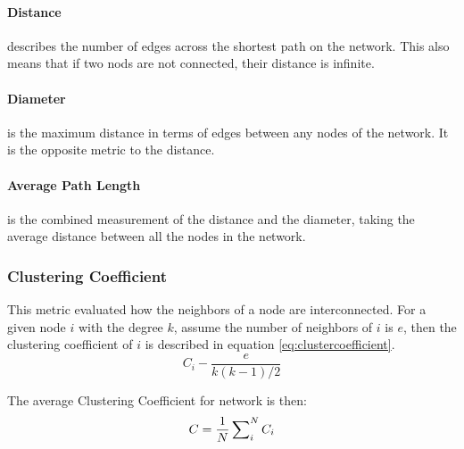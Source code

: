 		\paragraph{Distance} %
		\label{par:distance}
		describes the number of edges across the shortest path on the network.
		This also means that if two nods are not connected,
		their distance is infinite.

		\paragraph{Diameter} %
		\label{par:diameter}
		is the maximum distance in terms of edges between any nodes of the network.
		It is the opposite metric to the distance.

		\paragraph{Average Path Length} %
		\label{par:average_path_length}
		is the combined measurement of the distance and the diameter,
		taking the average distance between all the nodes in the network.

	\subsubsection{Clustering Coefficient} %
	\label{ssub:clustering_coefficient}
		This metric evaluated how the neighbors of a node are interconnected.
		For a given node $i$ with the degree $k$,
		assume the number of neighbors of $i$ is $e$,
		then the clustering coefficient of $i$ is described in equation \ref{eq:clustercoefficient}.
		\begin{equation}
		\label{eq:clustercoefficient}
		C_i - \frac{e}{k(k - 1)/2}
		\end{equation}

		The average Clustering Coefficient for network is then:
		\begin{equation}
		\label{eq:averagecc}
		C = \frac{1}{N} \sideset{}{_i^N}\sum C_i
		\end{equation}
